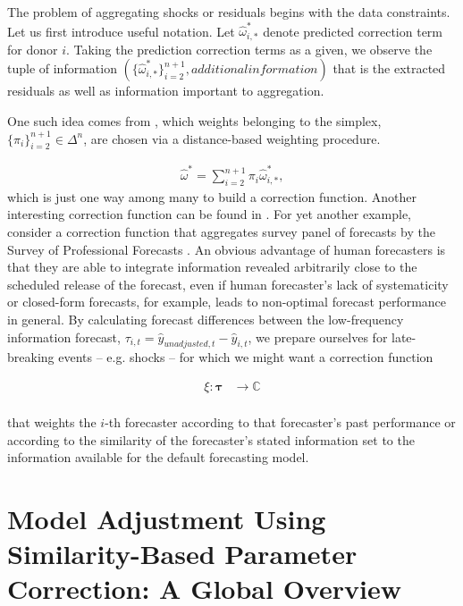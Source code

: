 \documentclass[11pt]{article}
\newcommand{\weight}{\pi}
\theoremstyle{definition}
\begin{document}
    The problem of aggregating shocks or residuals begins with the data constraints.  Let us first introduce useful notation.  Let $\hat\omega^{*}_{i,*}$ denote predicted correction term for donor $i$.   Taking the prediction correction terms as a given, we observe the tuple of information $(\{\hat\omega^{*}_{i,*}\}^{n+1}_{i=2}, additional information)$ that is the extracted residuals as well as information important to aggregation.  
    
  One such idea comes from \cite{lin2021minimizing}, which weights belonging to the simplex, $\{\weight_{i}\}^{n+1}_{i=2} \in \Delta^{n}$, are chosen via a distance-based weighting procedure.

\begin{align*} \label{adjustment}
	  \hat\omega^{*} = \sum^{n+1}_{i=2}\weight_{i}\hat\omega^{*}_{i,*},
\end{align*}
which is just one way among many to build a correction function.  Another interesting correction function can be found in \cite{foroni2022forecasting}.  For yet another example, consider a correction function that aggregates survey panel of forecasts by the Survey of Professional Forecasts \citep{croushore1993introducing}.  An obvious advantage of human forecasters is that they are able to integrate information revealed arbitrarily close to the scheduled release of the forecast, even if human forecaster's lack of systematicity or closed-form forecasts, for example, leads to non-optimal forecast performance in general.  By calculating forecast differences between the low-frequency information forecast, $\tau_{i,t}= \hat{y}_{unadjusted,t}-\hat{y}_{ i,t}$, we prepare ourselves for late-breaking events -- e.g. shocks -- for which we might want a correction function

\begin{align*}
\xi \colon \boldsymbol{\tau} &\to \mathbb{C}\\
\end{align*}

that weights the $i$-th forecaster according to that forecaster's past performance or according to the similarity of the forecaster's stated information set to the information available for the default forecasting model.

\section{Model Adjustment Using Similarity-Based Parameter Correction: A Global Overview}\label{global_overview}
\end{document}
